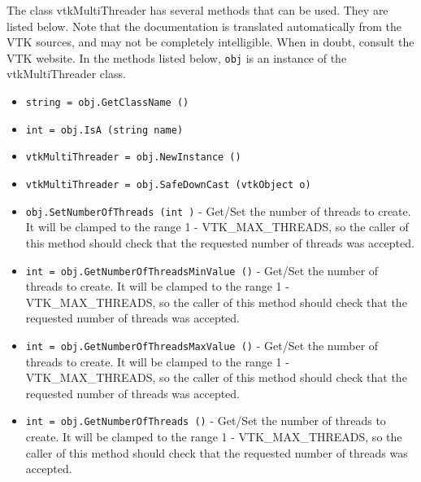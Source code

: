 The class vtkMultiThreader has several methods that can be used.
  They are listed below.
Note that the documentation is translated automatically from the VTK sources,
and may not be completely intelligible.  When in doubt, consult the VTK website.
In the methods listed below, \verb|obj| is an instance of the vtkMultiThreader class.
\begin{itemize}
\item  \verb|string = obj.GetClassName ()|

\item  \verb|int = obj.IsA (string name)|

\item  \verb|vtkMultiThreader = obj.NewInstance ()|

\item  \verb|vtkMultiThreader = obj.SafeDownCast (vtkObject o)|

\item  \verb|obj.SetNumberOfThreads (int )| -  Get/Set the number of threads to create. It will be clamped to the range
 1 - VTK\_MAX\_THREADS, so the caller of this method should check that the
 requested number of threads was accepted.

\item  \verb|int = obj.GetNumberOfThreadsMinValue ()| -  Get/Set the number of threads to create. It will be clamped to the range
 1 - VTK\_MAX\_THREADS, so the caller of this method should check that the
 requested number of threads was accepted.

\item  \verb|int = obj.GetNumberOfThreadsMaxValue ()| -  Get/Set the number of threads to create. It will be clamped to the range
 1 - VTK\_MAX\_THREADS, so the caller of this method should check that the
 requested number of threads was accepted.

\item  \verb|int = obj.GetNumberOfThreads ()| -  Get/Set the number of threads to create. It will be clamped to the range
 1 - VTK\_MAX\_THREADS, so the caller of this method should check that the
 requested number of threads was accepted.

\end{itemize}
